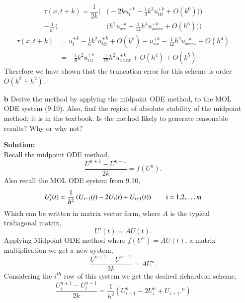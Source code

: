 \documentclass[12pt]{article}
\makeatletter
\theoremstyle{homework}
\newenvironment{exercise}[1]
{\def\@currentlabel{#1}\exercisecore}
{\endexercisecore}
\newcommand{\localhead}[1]{\par\smallskip\noindent\textbf{#1}\nobreak\\}%
\newcommand\solution{\localhead{Solution:}}
\makeatother
\begin{document}
\begin{exercise}{Problem P35}
\begin{enumerate}
      \begin{align*}
        \tau(x, t+k) = \dfrac{1}{2k} \biggl(&\bigl(- 2ku_{t}^{+k} - \frac{1}{3}k^3u_{ttt}^{+k} + O(k^6)\bigr)\biggr)\\
        -\frac{1}{h^2}\biggl(&\bigl(h^2u_{xx}^{+k} + \frac{1}{12}h^4u_{xxxx}^{+k} + O(h^6)\bigr)\biggr)
      \end{align*}
      \begin{align*}
        \tau(x, t+k) &= u_{t}^{+k} -  \frac{1}{6}k^2u_{ttt}^{+k} + O(k^5) - u_{xx}^{+k} - \frac{1}{12}h^2u_{xxxx}^{+k} + O(h^4)\\
        &= - \frac{1}{6}k^2u_{ttt}^{+k} - \frac{1}{12}h^2u_{xxxx}^{+k} + O(h^4) + O(k^5)
      \end{align*}
      Therefore we have shown that the truncation error for this scheme is order $O(k^2 + h^2)$.
  

      \vspace*{.15in}




      \item[\textbf{b}] Derive the method by applying the midpoint ODE method, to the MOL ODE system (9.10). 
      Also, find the region of absolute stability of the midpoint method; it is in the textbook. Is 
      the method likely to generate reasonable results? Why or why not?
      \solution Recall the midpoint ODE method, 
      \begin{equation*}
        \dfrac{U^{n + 1} - U^{n - 1}}{2k} = f(U^n).
      \end{equation*}
      Also recall the MOL ODE system from 9.10, 
      \begin{equation*}
        U'_i(t) = \frac{1}{h^2}\left(U_{i - 1}(t) - 2U_i(t) + U_{i + 1}(t)\right)\qquad \text{i = 1,2, \dots $m$}
      \end{equation*}
      Which can be written in matrix vector form, where $A$ is the typical tridiagonal matrix,
      \begin{equation*}
        U'(t) = AU(t).
      \end{equation*}
      Applying Midpoint ODE method where $f(U^n) = AU(t)$, a matrix multiplication we get a new system, 
      \begin{equation*}
        \dfrac{U^{n + 1} - U^{n - 1}}{2k} = AU^n.
      \end{equation*}
      Considering the $i^{th}$ row of this system we get the desired richardson scheme, 
      \begin{equation*}
        \dfrac{U_i^{n + 1} - U_i^{n - 1}}{2k} = \frac{1}{h^2}\left(U_{i - 1}^n - 2U_i^n + U_{i + 1}.^n\right)
      \end{equation*}


\end{enumerate}
\end{exercise}
\end{document}
